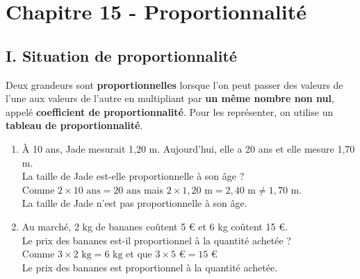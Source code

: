 \section*{Chapitre 15 - Proportionnalité}

\subsection*{I. Situation de proportionnalité}

\begin{Définition}[c]
Deux grandeurs sont \textbf{proportionnelles} lorsque l'on peut passer des valeurs de l'une aux valeurs de l'autre en multipliant par \textbf{un même nombre non nul}, appelé \textbf{coefficient de proportionnalité}. Pour les représenter, on utilise un \textbf{tableau de proportionnalité}.
\end{Définition}

\begin{Exemples}
\begin{enumerate}
\item À 10 ans, Jade mesurait 1,20 m. Aujourd'hui, elle a 20 ans et elle mesure 1,70 m.\\
La taille de Jade est-elle proportionnelle à son âge ? \\
Comme $2 \times 10\text{ ans}= 20\text{ ans}$ mais $2 \times 1,20\text{ m}= 2,40\text{ m} \neq 1,70\text{ m}$. \\
La taille de Jade n'est pas proportionnelle à son âge.
\item Au marché, 2 kg de bananes coûtent 5 € et 6 kg coûtent 15 €.\\
Le prix des bananes est-il proportionnel à la quantité achetée ?\\
Comme $3 \times 2 \text{ kg} = 6 \text{ kg}$ et que $3 \times 5 \text{ €}= 15 \text{ €}$\\
Le prix des bananes est proportionnel à la quantité achetée.
\end{enumerate}
\end{Exemples}

